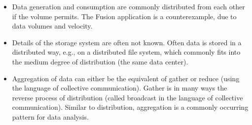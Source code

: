 \begin{itemize}
\item Data generation and consumption are commonly distributed from
  each other if the volume permits.  The Fusion application is a counterexample,
  due to data volumes and velocity.

\item Details of the storage system are often not known. Often data is
  stored in a distributed way, e.g., on a distributed file system,
  which commonly fits into the medium degree of distribution (the same
  data center).

	
\item Aggregation of data can either be the equivalent of gather or
reduce (using the language of collective communication). Gather is
in many ways the reverse process of distribution (called broadcast in the
language of collective communication). Similar to distribution, aggregation is a
commonly occurring pattern for data analysis.

\end{itemize}










